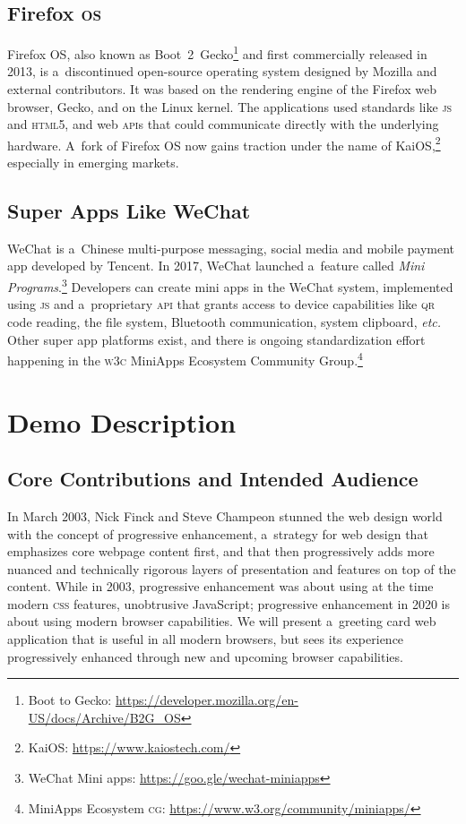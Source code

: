 \documentclass[sigconf]{acmart}
\begin{document}
\subsection{Firefox \textsc{os}}

Firefox \textsc{OS}, also known as
Boot~2~Gecko\footnote{Boot to Gecko: \url{https://developer.mozilla.org/en-US/docs/Archive/B2G_OS}}
and first commercially released in 2013,
is a~discontinued open-source operating system
designed by Mozilla and external contributors.
It was based on the rendering engine of the Firefox web browser, Gecko,
and on the Linux kernel.
The applications used standards like \textsc{js} and \textsc{html}5,
and web \textsc{api}s that could communicate directly with the underlying hardware.
A~fork of Firefox \textsc{OS} now gains traction under the name of
Kai\textsc{OS},\footnote{Kai\textsc{OS}: \url{https://www.kaiostech.com/}}
especially in emerging markets.

\subsection{Super Apps Like WeChat}

WeChat is a~Chinese multi-purpose messaging, social media and mobile payment app
developed by Tencent. 
In 2017, WeChat launched a~feature called
\textit{Mini Programs}.\footnote{WeChat Mini apps:
\url{https://goo.gle/wechat-miniapps}}
Developers can create mini apps in the WeChat system,
implemented using \textsc{js} and a~proprietary \textsc{api}
that grants access to device capabilities like \textsc{qr} code reading, the file system,
Bluetooth communication, system clipboard, \textit{etc.}
Other super app platforms exist, and there is ongoing standardization effort
happening in the \textsc{w3c} MiniApps Ecosystem Community
Group.\footnote{MiniApps Ecosystem \textsc{cg}: \url{https://www.w3.org/community/miniapps/}}

\section{Demo Description}

\subsection{Core Contributions and Intended Audience}

In March 2003, Nick Finck and Steve Champeon stunned the web design world
with the concept of progressive enhancement,
a~strategy for web design that emphasizes core webpage content first,
and that then progressively adds more nuanced and technically rigorous layers
of presentation and features on top of the content.
While in 2003, progressive enhancement was about using at the time modern \textsc{css} features,
unobtrusive JavaScript; progressive enhancement in 2020 is about using modern browser capabilities.
We will present a~greeting card web application that is useful in all modern browsers,
but sees its experience progressively enhanced through new and upcoming browser capabilities.
\end{document}
